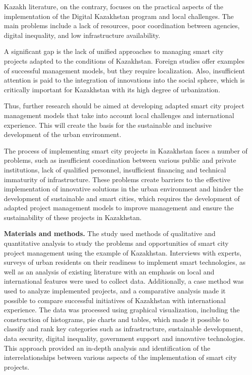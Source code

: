 \begin{multicols}{2}
Kazakh literature, on the contrary, focuses on the practical aspects of
the implementation of the Digital Kazakhstan program and local
challenges. The main problems include a lack of resources, poor
coordination between agencies, digital inequality, and low
infrastructure availability.

A significant gap is the lack of unified approaches to managing smart
city projects adapted to the conditions of Kazakhstan. Foreign studies
offer examples of successful management models, but they require
localization. Also, insufficient attention is paid to the integration of
innovations into the social sphere, which is critically important for
Kazakhstan with its high degree of urbanization.

Thus, further research should be aimed at developing adapted smart city
project management models that take into account local challenges and
international experience. This will create the basis for the sustainable
and inclusive development of the urban environment.

The process of implementing smart city projects in Kazakhstan faces a
number of problems, such as insufficient coordination between various
public and private institutions, lack of qualified personnel,
insufficient financing and technical immaturity of infrastructure. These
problems create barriers to the effective implementation of innovative
solutions in the urban environment and hinder the development of
sustainable and smart cities, which requires the development of adapted
project management models to improve management and ensure the
sustainability of these projects in Kazakhstan.

{\bfseries Materials and methods.} The study used methods of qualitative
and quantitative analysis to study the problems and opportunities of
smart city project management using the example of Kazakhstan.
Interviews with experts, surveys of urban residents on their readiness
to implement smart technologies, as well as an analysis of existing
literature with an emphasis on local and international features were
used to collect data. Additionally, a case method was used to analyze
implemented projects, and a comparative analysis made it possible to
compare successful initiatives of Kazakhstan with international
experience. The data was processed using graphical visualization,
including the construction of histograms, pie charts and tables, which
made it possible to classify and rank key categories such as
infrastructure, sustainable development, data security, digital
inequality, government support and innovative technologies. This
approach provided an in-depth analysis and identification of the
interrelationships between various aspects of the implementation of
smart city projects.


\end{multicols}
